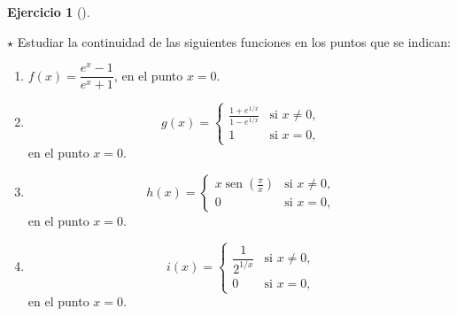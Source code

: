 \documentclass[
  spanish,
  a4paper,
]{scrreport}
\theoremstyle{definition}
\newtheorem{exercise}{Ejercicio}[chapter]
\theoremstyle{remark}
\begin{document}
\begin{exercise}[]\protect\hypertarget{exr-clasificacion-dicontinuidades}{}\label{exr-clasificacion-dicontinuidades}

\(\star\) Estudiar la continuidad de las siguientes funciones en los
puntos que se indican:

\begin{enumerate}
\def\labelenumi{\alph{enumi}.}
\item
  \(f(x)=\dfrac{e^x-1}{e^x+1}\), en el punto \(x=0\).
\item
  \[
  g(x)=
  \begin{cases}
  \frac{1+e^{1/x}}{1-e^{1/x}} & \mbox{si $x\neq 0$,} \\
  1 &  \mbox{si $x=0$,}
  \end{cases}
  \] en el punto \(x=0\).
\item
  \[
  h(x)=
  \begin{cases}
  x\operatorname{sen}\left(\frac{\pi}{x}\right) & \mbox{si $x\neq 0$,} \\
  0 & \mbox{si $x=0$,}
  \end{cases}
  \] en el punto \(x=0\).
\item
  \[
  i(x)=
  \begin{cases}
  \dfrac{1}{2^{1/x}} &  \mbox{si $x\neq 0$,} \\
  0 & \mbox{si $x=0$,}
  \end{cases}
  \] en el punto \(x=0\).
\end{enumerate}

\end{exercise}
\end{document}
